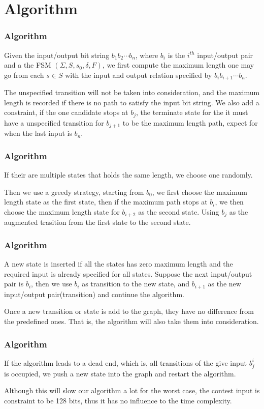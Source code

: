 \documentclass[aspectratio=169]{beamer}
\begin{document}
\section{Algorithm}

\begin{frame}
\frametitle{Algorithm}
Given the input/output bit string $b_1b_2\cdots b_n$, where $b_i$ is the $i^{th}$ input/output pair and a the FSM $(\Sigma, S, s_0, \delta, F)$, we first compute the maximum length one may go from each $s \in S$ with the input and output relation specified by $b_ib_{i+1}\cdots b_n$. 

The unspecified transition will not be taken into consideration, and the maximum length is recorded if there is no path to satisfy the input bit string. We also add a constraint, if the one candidate stops at $b_j$, the terminate state for the it must have a unspecified transition for $b_{j+1}$ to be the maximum length path, expect for when the last input is $b_n$.
\end{frame}

\begin{frame}
\frametitle{Algorithm}
If their are multiple states that holds the same length, we choose one randomly.

Then we use a greedy strategy, starting from $b_0$, we first choose the maximum length state as the first state, then if the maximum path stops at $b_i$, we then choose the maximum length state for $b_{i + 2}$ as the second state. Using $b_j$ as the augmented trasition from the first state to the second state.
\end{frame}

\begin{frame}
\frametitle{Algorithm}
A new state is inserted if all the states has zero maximum length and the required input is already specified for all states. Suppose the next input/output pair is $b_i$, then we use $b_i$ as transition to the new state, and $b_{i + 1}$ as the new input/output pair(transition) and continue the algorithm.

Once a new transition or state is add to the graph, they have no difference from the predefined ones. That is, the algorithm will also take them into consideration.
\end{frame}

\begin{frame}
\frametitle{Algorithm}
If the algorithm leads to a dead end, which is, all transitions of the give input $b^i_j$ is occupied, we push a new state into the graph and restart the algorithm.

Although this will slow our algorithm a lot for the worst case, the contest input is constraint to be 128 bits, thus it has no influence to the time complexity.
\end{frame}
\end{document}
